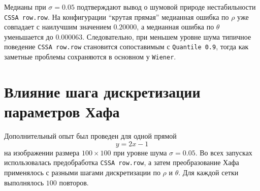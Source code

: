\begin{table}[H]
	\centering
	\caption{Медианные ошибки оценивания параметра $\theta$ по конфигурациям прямой при $\sigma=0.05$}
	\label{tab:chapter3-theta-config-low-noise-median}
\end{table}

Медианы при $\sigma=0.05$ подтверждают вывод о шумовой природе нестабильности
\texttt{CSSA row.row}. На конфигурации ``крутая прямая'' медианная ошибка по
$\rho$ уже совпадает с наилучшим значением $0.20000$, а медианная ошибка по
$\theta$ уменьшается до $0.000063$. Следовательно, при меньшем уровне шума
типичное поведение \texttt{CSSA row.row} становится сопоставимым с
\texttt{Quantile 0.9}, тогда как заметные проблемы сохраняются в основном у
\texttt{Wiener}.

\section{Влияние шага дискретизации параметров Хафа}

Дополнительный опыт был проведен для одной прямой
\[
y = 2x - 1
\]
на изображении размера $100\times100$ при уровне шума $\sigma=0.05$. Во всех
запусках использовалась предобработка \texttt{CSSA row.row}, а затем
преобразование Хафа применялось с разными шагами дискретизации по $\rho$ и
$\theta$. Для каждой сетки выполнялось $100$ повторов.

